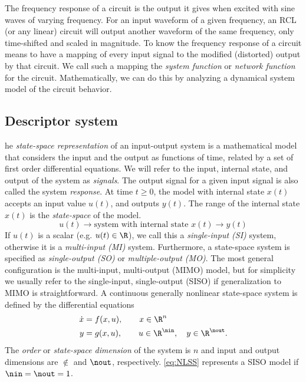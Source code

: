 The frequency response of a circuit is the output it gives when excited with sine waves of varying frequency.   For an input waveform of a given frequency, an RCL (or any linear) circuit will output another waveform of the same frequency, only time-shifted and scaled in magnitude.    To know the frequency response of a circuit means to have a mapping of every input signal to the modified (distorted) output by that circuit.  We call such a mapping the \emph{system function} or \emph{network function}  for the circuit.   Mathematically, we can do this by analyzing a dynamical system model of the circuit behavior.  

\clearpage
\subsection{Descriptor system}
he \emph{state-space representation} of an input-output system is a mathematical model that considers the input and the output as functions of time, related by a set of first order differential equations.  We will refer to the input, internal state, and output of the system as \emph{signals}.   The output signal for a given input signal is also called the system \emph{response}.
At time $t\geq 0$, the model with internal state $x(t)$ accepts an input value $u(t)$, and outputs $y(t)$.     The range of the internal state $x(t)$ is the \emph{state-space} of the model.
\[
u(t) \longrightarrow \boxed{\text{system with internal state }x(t)} \longrightarrow y(t) 
\] 
If $u(t)$ is a scalar (e.g. $u(t)\in\R$), we call this a \emph{single-input (SI)} system, otherwise it is a \emph{multi-input (MI)} system.  Furthermore, a state-space system is specified as \emph{single-output (SO)} or  \emph{multiple-output (MO)}.   The most general configuration is the multi-input, multi-output (MIMO) model, but for simplicity we  usually refer to the single-input, single-output (SISO) if generalization to MIMO is straightforward.   A continuous generally nonlinear state-space system is defined by the differential equations 
\begin{equation}
\begin{aligned}
\dot{x} &= f(x,u),  \qquad  x\in\R^n \\ 
y &= g(x,u), \qquad u\in\R^\nin, \quad y\in\R^\nout. 
\label{eq:NLSS}
\end{aligned}
\end{equation}
The \emph{order} or \emph{state-space dimension} of the system is $n$ and input and output dimensions are $\nin$ and $\nout$, respectively.  \eqref{eq:NLSS} represents a SISO model if $\nin=\nout=1$.  

